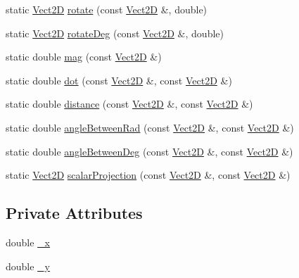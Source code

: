 \begin{DoxyCompactItemize}
\item 
static \hyperlink{classVect2D}{Vect2D} \hyperlink{classVect2D_ac609c29d60516b1c802be365635a1c4b_ac609c29d60516b1c802be365635a1c4b}{rotate} (const \hyperlink{classVect2D}{Vect2D} \&, double)
\item 
static \hyperlink{classVect2D}{Vect2D} \hyperlink{classVect2D_a9b5ef5a8c654231b3c481f715d4210d5_a9b5ef5a8c654231b3c481f715d4210d5}{rotate\+Deg} (const \hyperlink{classVect2D}{Vect2D} \&, double)
\item 
static double \hyperlink{classVect2D_a376f089a44760de2d73939e5cbd603d0_a376f089a44760de2d73939e5cbd603d0}{mag} (const \hyperlink{classVect2D}{Vect2D} \&)
\item 
static double \hyperlink{classVect2D_a46b44def87620ebfe9991514a544d3a4_a46b44def87620ebfe9991514a544d3a4}{dot} (const \hyperlink{classVect2D}{Vect2D} \&, const \hyperlink{classVect2D}{Vect2D} \&)
\item 
static double \hyperlink{classVect2D_afc6a031b9dd2200be039def103dcd1c8_afc6a031b9dd2200be039def103dcd1c8}{distance} (const \hyperlink{classVect2D}{Vect2D} \&, const \hyperlink{classVect2D}{Vect2D} \&)
\item 
static double \hyperlink{classVect2D_a3f8039dc87affb32f851b1937a1fa2fd_a3f8039dc87affb32f851b1937a1fa2fd}{angle\+Between\+Rad} (const \hyperlink{classVect2D}{Vect2D} \&, const \hyperlink{classVect2D}{Vect2D} \&)
\item 
static double \hyperlink{classVect2D_a29c384be9242c7426b2a5d330fe78a08_a29c384be9242c7426b2a5d330fe78a08}{angle\+Between\+Deg} (const \hyperlink{classVect2D}{Vect2D} \&, const \hyperlink{classVect2D}{Vect2D} \&)
\item 
static \hyperlink{classVect2D}{Vect2D} \hyperlink{classVect2D_aee86f314ed5020f7dada62cf2b29a532_aee86f314ed5020f7dada62cf2b29a532}{scalar\+Projection} (const \hyperlink{classVect2D}{Vect2D} \&, const \hyperlink{classVect2D}{Vect2D} \&)
\end{DoxyCompactItemize}
\subsection*{Private Attributes}
\begin{DoxyCompactItemize}
\item 
double \hyperlink{classVect2D_aa41c2c1afe6d0ac0cf18b5fdc9e98721_aa41c2c1afe6d0ac0cf18b5fdc9e98721}{\+\_\+x}
\item 
double \hyperlink{classVect2D_a0191f309063b9219ea38d5eb24e55e42_a0191f309063b9219ea38d5eb24e55e42}{\+\_\+y}
\end{DoxyCompactItemize}
